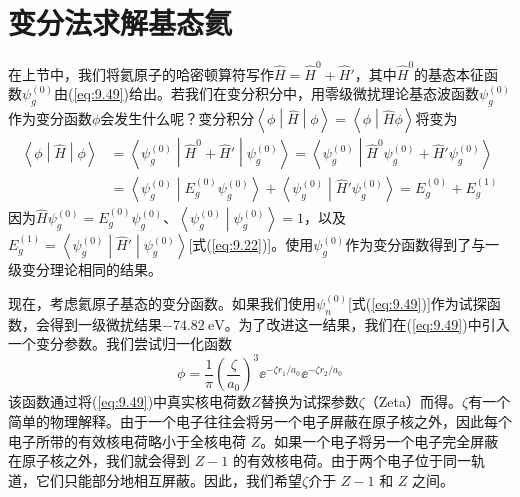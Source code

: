 \section{变分法求解基态氦}
\label{sec:9.4 Variational Treatments of the Ground State of Helium}
    在上节中，我们将氦原子的哈密顿算符写作$\hat{H} = \hat{H}^0 + \hat{H}'$，其中$\hat{H}^0$的基态本征函数$\psi_g^{\left(0\right)}$由(\ref{eq:9.49})给出。若我们在变分积分中，用零级微扰理论基态波函数$\psi_g^{\left(0\right)}$作为变分函数$\phi$会发生什么呢？变分积分$\left\langle \phi \middle| \hat{H} \middle| \phi \right\rangle = \left\langle \phi \middle| \hat{H} \phi \right\rangle$将变为
    \begin{equation}
        \begin{aligned}
            \left\langle \phi \middle| \hat{H} \middle| \phi \right\rangle &= \left\langle \psi_g^{\left(0\right)} \middle| \hat{H}^0 + \hat{H}' \middle| \psi_g^{\left(0\right)} \right\rangle = \left\langle \psi_g^{\left(0\right)} \middle| \hat{H}^0\psi_g^{\left(0\right)} + \hat{H}' \psi_g^{\left(0\right)} \right\rangle \\
            &= \left\langle \psi_g^{\left(0\right)} \middle| E_g^{\left(0\right)}\psi_g^{\left(0\right)} \right\rangle + \left\langle \psi_g^{\left(0\right)} \middle| \hat{H}' \psi_g^{\left(0\right)} \right\rangle = E_g^{\left(0\right)} + E_g^{\left(1\right)}
        \end{aligned}
        \label{eq:9.55}
    \end{equation}
    因为$\hat{H}\psi_g^{\left(0\right)} = E_g^{\left(0\right)}\psi_g^{\left(0\right)}$、$\left\langle \psi_g^{\left(0\right)} \middle| \psi_g^{\left(0\right)} \right\rangle = 1$，以及$E_g^{\left(1\right)} = \left\langle \psi_g^{\left(0\right)} \middle| \hat{H}' \middle| \psi_g^{\left(0\right)} \right\rangle$[式(\ref{eq:9.22})]。使用$\psi_g^{\left(0\right)}$作为变分函数得到了与一级变分理论相同的结果。

    现在，考虑氦原子基态的变分函数。如果我们使用$\psi_n^{\left(0\right)}$[式(\ref{eq:9.49})]作为试探函数，会得到一级微扰结果$-74.82 \: \mathrm{eV}$。为了改进这一结果，我们在(\ref{eq:9.49})中引入一个变分参数。我们尝试归一化函数
    \begin{equation}
        \phi = \frac{1}{\pi} \left(\frac{\zeta}{a_0}\right)^3 \ee ^{-\zeta r_1/a_0} \ee ^{-\zeta r_2/a_0}
        \label{eq:9.56}
    \end{equation}
    该函数通过将(\ref{eq:9.49})中真实核电荷数$Z$替换为试探参数$\zeta$（Zeta）而得。$\zeta$有一个简单的物理解释。由于一个电子往往会将另一个电子屏蔽在原子核之外，因此每个电子所带的有效核电荷略小于全核电荷 $Z$。如果一个电子将另一个电子完全屏蔽在原子核之外，我们就会得到 $Z-1$ 的有效核电荷。由于两个电子位于同一轨道，它们只能部分地相互屏蔽。因此，我们希望$\zeta$介于 $Z-1$ 和 $Z$ 之间。

